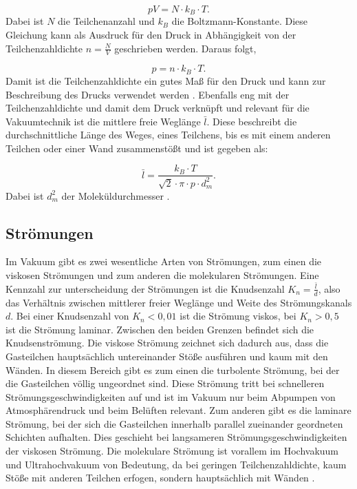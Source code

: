     \begin{equation}
    \label{equ:1}
        pV = N \cdot k_B \cdot T.
    \end{equation}
Dabei ist $N$ die Teilchenanzahl und $k_B$ die Boltzmann-Konstante.
Diese Gleichung kann als Ausdruck für den Druck in Abhängigkeit von der Teilchenzahldichte $n = \frac{N}{V}$ geschrieben werden. 
Daraus folgt,

    \begin{equation}
    \label{equ:2}
        p = n \cdot k_B \cdot T.
    \end{equation}
Damit ist die Teilchenzahldichte ein gutes Maß für den Druck und kann zur Beschreibung des Drucks verwendet werden \cite{Pfeiffer, S.11}.
Ebenfalls eng mit der Teilchenzahldichte und damit dem Druck verknüpft und relevant für die Vakuumtechnik ist die mittlere freie Weglänge $\bar{l}$.
Diese beschreibt die durchschnittliche Länge des Weges, eines Teilchens, bis es mit einem anderen Teilchen oder einer Wand zusammenstößt 
und ist gegeben als:

\begin{equation}
\label{equ:3}
    \bar{l} = \frac{k_B \cdot T}{\sqrt{2} \cdot \pi \cdot p \cdot d_m^2}.
\end{equation}
Dabei ist $d_m^2$ der Moleküldurchmesser \cite{Pfeiffer, S.12}.


\subsection{Strömungen}
\label{sec:Strömungen}
Im Vakuum gibt es zwei wesentliche Arten von Strömungen, zum einen die viskosen Strömungen und zum anderen die molekularen Strömungen.
Eine Kennzahl zur unterscheidung der Strömungen ist die Knudsenzahl $K_n = \frac{\bar{l}}{d}$, also das Verhältnis zwischen mittlerer freier Weglänge 
und Weite des Strömungskanals $d$.
Bei einer Knudsenzahl von $K_n < 0,01$ ist die Strömung viskos, bei $K_n > 0,5$ ist die Strömung laminar. Zwischen den beiden Grenzen befindet sich die 
Knudsenströmung.
Die viskose Strömung zeichnet sich dadurch aus, dass die Gasteilchen hauptsächlich untereinander Stöße ausführen und kaum mit den Wänden.
In diesem Bereich gibt es zum einen die turbolente Strömung, bei der die Gasteilchen völlig ungeordnet sind. Diese Strömung tritt bei schnelleren 
Strömungsgeschwindigkeiten auf und ist im Vakuum nur beim Abpumpen von Atmosphärendruck und beim Belüften relevant.
Zum anderen gibt es die laminare Strömung, bei der sich die Gasteilchen innerhalb parallel zueinander geordneten Schichten aufhalten.
Dies geschieht bei langsameren Strömungsgeschwindigkeiten der viskosen Strömung.
Die molekulare Strömung ist vorallem im Hochvakuum und Ultrahochvakuum von Bedeutung, da bei geringen Teilchenzahldichte, kaum Stöße mit anderen Teilchen erfogen, 
sondern hauptsächlich mit Wänden \cite{Pfeiffer}.


